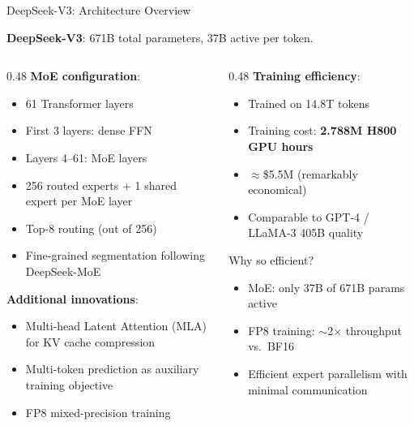 \begin{frame}{DeepSeek-V3: Architecture Overview}

  \textbf{DeepSeek-V3}: 671B total parameters, 37B active per token.

  \vspace{0.5em}
  \begin{columns}
    \begin{column}{0.48\textwidth}
      \textbf{MoE configuration}:
      \begin{itemize}
        \item 61 Transformer layers
        \item First 3 layers: dense FFN
        \item Layers 4--61: MoE layers
        \item 256 routed experts + 1 shared expert per MoE layer
        \item Top-8 routing (out of 256)
        \item Fine-grained segmentation following DeepSeek-MoE
      \end{itemize}

      \vspace{0.3em}
      \textbf{Additional innovations}:
      \begin{itemize}
        \item Multi-head Latent Attention (MLA) for KV cache compression
        \item Multi-token prediction as auxiliary training objective
        \item FP8 mixed-precision training
      \end{itemize}
    \end{column}
    \begin{column}{0.48\textwidth}
      \textbf{Training efficiency}:
      \begin{itemize}
        \item Trained on 14.8T tokens
        \item Training cost: \textbf{2.788M H800 GPU hours}
        \item $\approx$\$5.5M (remarkably economical)
        \item Comparable to GPT-4 / LLaMA-3 405B quality
      \end{itemize}

      \vspace{0.3em}
      \begin{block}{Why so efficient?}
        \begin{itemize}
          \item MoE: only 37B of 671B params active
          \item FP8 training: $\sim$2$\times$ throughput vs.\ BF16
          \item Efficient expert parallelism with minimal communication
        \end{itemize}
      \end{block}
    \end{column}
  \end{columns}
\end{frame}

